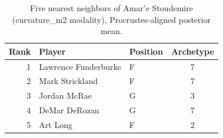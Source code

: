 \begin{table}[htbp]
  \centering\small
  \begin{tabular}{rllc}
    \toprule
    Rank & Player & Position & Archetype \\
    \midrule
    1 & Lawrence Funderburke & F & 7 \\
    2 & Mark Strickland & F & 7 \\
    3 & Jordan McRae & G & 3 \\
    4 & DeMar DeRozan & G & 7 \\
    5 & Art Long & F & 2 \\
    \bottomrule
  \end{tabular}
  \caption{Five nearest neighbors of Amar'e Stoudemire (curvature_m2 modality), Procrustes-aligned posterior mean.}
  \label{tab:Amar_e_Stoudemire_neighbors_curvature_m2}
\end{table}

